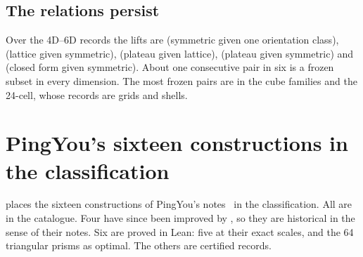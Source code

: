 \documentclass[11pt,a4paper]{article}
\begin{document}
\subsection{The relations persist}
Over the 4D--6D records the lifts are \ndLiftSymOne{} (symmetric given one orientation class), \ndLiftLatSym{} (lattice given symmetric), \ndLiftPlaLat{} (plateau given lattice), \ndLiftPlaSym{} (plateau given symmetric) and \ndLiftCfSym{} (closed form given symmetric). About one consecutive pair in six is a frozen subset in every dimension. The most frozen pairs are in the cube families and the 24-cell, whose records are grids and shells.

\section{PingYou's sixteen constructions in the classification}\label{sec:sixteen}

 places the sixteen constructions of PingYou's notes~\cite{pingSixteen} in the classification. All are in the catalogue. Four have since been improved by , so they are historical in the sense of their notes. Six are proved in Lean: five at their exact scales, and the 64 triangular prisms as optimal. The others are certified records.
\end{document}

